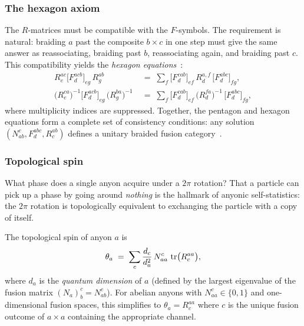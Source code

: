 \subsubsection*{The hexagon axiom}

The $R$-matrices must be compatible with the $F$-symbols.  The requirement is
natural: braiding $a$ past the composite $b \times c$ in one step must give the
same answer as reassociating, braiding past $b$, reassociating again, and
braiding past $c$.  This compatibility yields the \emph{hexagon
equations}~\cite{NayakSimonSternFreedmanDasSarma2008NonabelianAnyons}:
\begin{align}
\label{eq:hexagon-1}
    R^{ac}_e \bigl[F^{acb}_d\bigr]_{eg}\, R^{ab}_g
    &\;=\; \sum_f \bigl[F^{cab}_d\bigr]_{ef}\, R^{a,f}_d\,
    \bigl[F^{abc}_d\bigr]_{fg}, \\[4pt]
\label{eq:hexagon-2}
    \bigl(R^{ca}_e\bigr)^{-1} \bigl[F^{acb}_d\bigr]_{eg}\,
    \bigl(R^{ba}_g\bigr)^{-1}
    &\;=\; \sum_f \bigl[F^{cab}_d\bigr]_{ef}\,
    \bigl(R^{fa}_d\bigr)^{-1}\, \bigl[F^{abc}_d\bigr]_{fg},
\end{align}
where multiplicity indices are suppressed.  Together, the pentagon and hexagon
equations form a complete set of consistency conditions: any solution
$(N^c_{ab}, F^{abc}_d, R^{ab}_c)$ defines a unitary braided fusion
category~\cite{NayakSimonSternFreedmanDasSarma2008NonabelianAnyons}.

\subsubsection*{Topological spin}

What phase does a single anyon acquire under a $2\pi$ rotation?  That a particle
can pick up a phase by going around \emph{nothing} is the hallmark of anyonic
self-statistics: the $2\pi$ rotation is topologically equivalent to exchanging the
particle with a copy of itself.

\begin{definition}
\label{def:topological-spin}
The topological spin of anyon $a$ is
\begin{equation}
\label{eq:topological-spin}
    \theta_a \;=\; \sum_c \frac{d_c}{d_a^2}\, N^c_{aa}\, \operatorname{tr}\bigl(R^{aa}_c\bigr),
\end{equation}
where $d_a$ is the \emph{quantum dimension} of $a$ (defined by the largest
eigenvalue of the fusion matrix $(N_a)^c_b = N^c_{ab}$).
For abelian anyons with $N^c_{aa} \in \{0,1\}$ and one-dimensional fusion
spaces, this simplifies to $\theta_a = R^{aa}_c$ where $c$ is the unique
fusion outcome of $a \times a$ containing the appropriate channel.
\end{definition}

